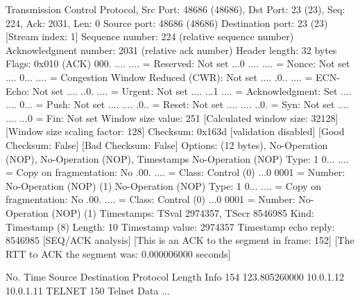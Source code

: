 Transmission Control Protocol, Src Port: 48686 (48686), Dst Port: 23 (23), Seq: 224, Ack: 2031, Len: 0
    Source port: 48686 (48686)
    Destination port: 23 (23)
    [Stream index: 1]
    Sequence number: 224    (relative sequence number)
    Acknowledgment number: 2031    (relative ack number)
    Header length: 32 bytes
    Flags: 0x010 (ACK)
        000. .... .... = Reserved: Not set
        ...0 .... .... = Nonce: Not set
        .... 0... .... = Congestion Window Reduced (CWR): Not set
        .... .0.. .... = ECN-Echo: Not set
        .... ..0. .... = Urgent: Not set
        .... ...1 .... = Acknowledgment: Set
        .... .... 0... = Push: Not set
        .... .... .0.. = Reset: Not set
        .... .... ..0. = Syn: Not set
        .... .... ...0 = Fin: Not set
    Window size value: 251
    [Calculated window size: 32128]
    [Window size scaling factor: 128]
    Checksum: 0x163d [validation disabled]
        [Good Checksum: False]
        [Bad Checksum: False]
    Options: (12 bytes), No-Operation (NOP), No-Operation (NOP), Timestamps
        No-Operation (NOP)
            Type: 1
                0... .... = Copy on fragmentation: No
                .00. .... = Class: Control (0)
                ...0 0001 = Number: No-Operation (NOP) (1)
        No-Operation (NOP)
            Type: 1
                0... .... = Copy on fragmentation: No
                .00. .... = Class: Control (0)
                ...0 0001 = Number: No-Operation (NOP) (1)
        Timestamps: TSval 2974357, TSecr 8546985
            Kind: Timestamp (8)
            Length: 10
            Timestamp value: 2974357
            Timestamp echo reply: 8546985
    [SEQ/ACK analysis]
        [This is an ACK to the segment in frame: 152]
        [The RTT to ACK the segment was: 0.000006000 seconds]

No.     Time           Source                Destination           Protocol Length Info
    154 123.805260000  10.0.1.12             10.0.1.11             TELNET   150    Telnet Data ...

